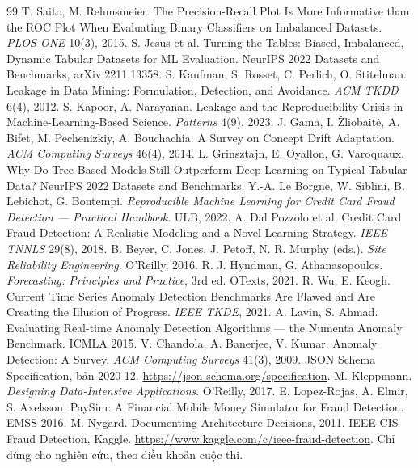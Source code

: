 \documentclass[11pt,a4paper]{article}
\begin{document}
\begin{thebibliography}{99}\small
{} T. Saito, M. Rehmsmeier. The Precision-Recall Plot Is More Informative than the ROC Plot When Evaluating Binary Classifiers on Imbalanced Datasets. \emph{PLOS ONE} 10(3), 2015.
 S. Jesus et al. Turning the Tables: Biased, Imbalanced, Dynamic Tabular Datasets for ML Evaluation. NeurIPS 2022 Datasets and Benchmarks, arXiv:2211.13358.
 S. Kaufman, S. Rosset, C. Perlich, O. Stitelman. Leakage in Data Mining: Formulation, Detection, and Avoidance. \emph{ACM TKDD} 6(4), 2012.
 S. Kapoor, A. Narayanan. Leakage and the Reproducibility Crisis in Machine-Learning-Based Science. \emph{Patterns} 4(9), 2023.
 J. Gama, I. Žliobaitė, A. Bifet, M. Pechenizkiy, A. Bouchachia. A Survey on Concept Drift Adaptation. \emph{ACM Computing Surveys} 46(4), 2014.
 L. Grinsztajn, E. Oyallon, G. Varoquaux. Why Do Tree-Based Models Still Outperform Deep Learning on Typical Tabular Data? NeurIPS 2022 Datasets and Benchmarks.
 Y.-A. Le Borgne, W. Siblini, B. Lebichot, G. Bontempi. \emph{Reproducible Machine Learning for Credit Card Fraud Detection — Practical Handbook}. ULB, 2022.
 A. Dal Pozzolo et al. Credit Card Fraud Detection: A Realistic Modeling and a Novel Learning Strategy. \emph{IEEE TNNLS} 29(8), 2018.
 B. Beyer, C. Jones, J. Petoff, N. R. Murphy (eds.). \emph{Site Reliability Engineering}. O'Reilly, 2016.
 R. J. Hyndman, G. Athanasopoulos. \emph{Forecasting: Principles and Practice}, 3rd ed. OTexts, 2021.
 R. Wu, E. Keogh. Current Time Series Anomaly Detection Benchmarks Are Flawed and Are Creating the Illusion of Progress. \emph{IEEE TKDE}, 2021.
 A. Lavin, S. Ahmad. Evaluating Real-time Anomaly Detection Algorithms — the Numenta Anomaly Benchmark. ICMLA 2015.
 V. Chandola, A. Banerjee, V. Kumar. Anomaly Detection: A Survey. \emph{ACM Computing Surveys} 41(3), 2009.
 JSON Schema Specification, bản 2020-12. \url{https://json-schema.org/specification}.
 M. Kleppmann. \emph{Designing Data-Intensive Applications}. O'Reilly, 2017.
 E. Lopez-Rojas, A. Elmir, S. Axelsson. PaySim: A Financial Mobile Money Simulator for Fraud Detection. EMSS 2016.
 M. Nygard. Documenting Architecture Decisions, 2011.
 IEEE-CIS Fraud Detection, Kaggle. \url{https://www.kaggle.com/c/ieee-fraud-detection}. Chỉ dùng cho nghiên cứu, theo điều khoản cuộc thi.
\end{thebibliography}
\end{document}
